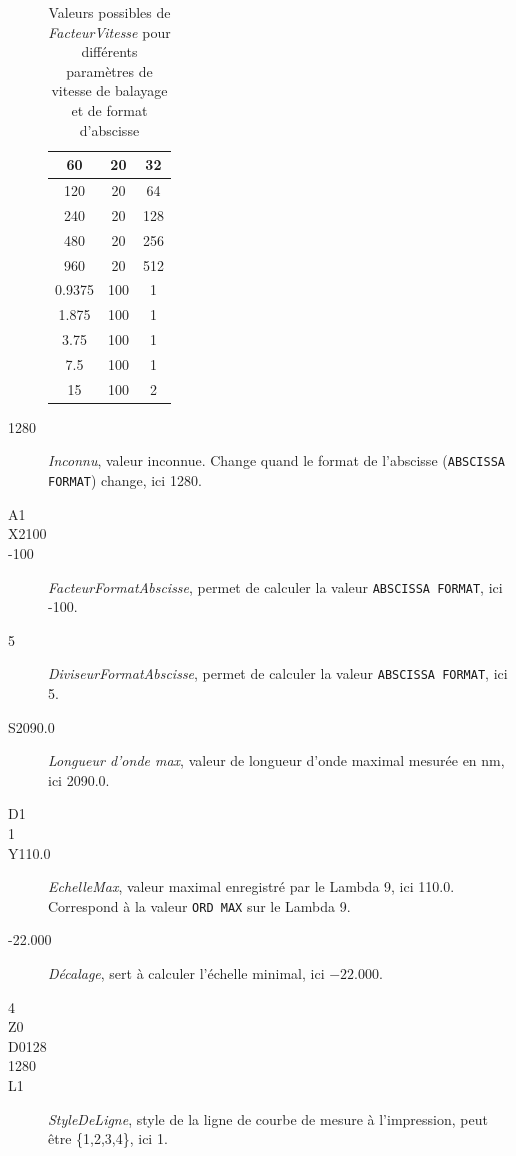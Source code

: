\documentclass[a4paper, 12pt]{article}
\begin{document}
\begin{description}
\begin{table}[htb]
\begin{tabular}{|c|c|c|}
60                               & 20                                    & 32             \\ \hline
120                              & 20                                    & 64             \\ \hline
240                              & 20                                    & 128            \\ \hline
480                              & 20                                    & 256            \\ \hline
960                              & 20                                    & 512            \\ \hline
0.9375                           & 100                                   & 1              \\ \hline
1.875                            & 100                                   & 1              \\ \hline
3.75                             & 100                                   & 1              \\ \hline
7.5                              & 100                                   & 1              \\ \hline
15                               & 100                                   & 2              \\ \hline
	\end{tabular}
	\centering
	\caption{Valeurs possibles de \emph{FacteurVitesse} pour différents paramètres de vitesse de balayage et de format d'abscisse }
	\label{table:ValeursFacteurVitesse}

\end{table}
		

	\item[1280] \emph{Inconnu}, valeur inconnue. Change quand le format de l'abscisse (\verb|ABSCISSA FORMAT|) change, ici 1280.
	\item[A1]
	\item[X2100]
	\item[-100] \emph{FacteurFormatAbscisse}, permet de calculer la valeur \verb|ABSCISSA FORMAT|, ici -100.
	\item[5] \emph{DiviseurFormatAbscisse}, permet de calculer la valeur \verb|ABSCISSA FORMAT|, ici 5.
	\item[S2090.0] \emph{Longueur d'onde max}, valeur de longueur d'onde maximal mesurée en nm, ici 2090.0.
	\item[D1]
	\item[1]
	\item[Y110.0] \emph{EchelleMax}, valeur maximal enregistré par le Lambda 9, ici 110.0.
		Correspond à la valeur \verb|ORD MAX| sur le Lambda 9.
	\item[-22.000] \emph{Décalage}, sert à calculer l'échelle minimal, ici $-22.000$.
	\item[4]
	\item[Z0]
	\item[D0128]
	\item[1280]
	\item[L1] \emph{StyleDeLigne}, style de la ligne de courbe de mesure à l'impression, peut être \{1,2,3,4\}, ici 1.


\end{description}
\end{document}
